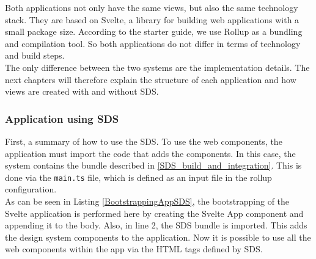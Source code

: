 Both applications not only have the same views, but also the same technology stack. They are based on Svelte, a library for building web applications with a small package size. According to the starter guide, we use Rollup as a bundling and compilation tool. So both applications do not differ in terms of technology and build steps. \cite{svelte_svelte_nodate} \\
The only difference between the two systems are the implementation details. The next chapters will therefore explain the structure of each application and how views are created with and without SDS.
\subsubsection{Application using \ac{SDS}}
First, a summary of how to use the \acl{SDS}. To use the web components, the application must import the code that adds the components. In this case, the system contains the bundle described in \ref{SDS_build_and_integration}. This is done via the \texttt{main.ts} file, which is defined as an input file in the rollup configuration. \\

As can be seen in Listing \ref{BootstrappingAppSDS}, the bootstrapping of the Svelte application is performed here by creating the Svelte App component and appending it to the body. Also, in line 2, the SDS bundle is imported. This adds the design system components to the application. Now it is possible to use all the web components within the app via the HTML tags defined by \ac{SDS}. \\


